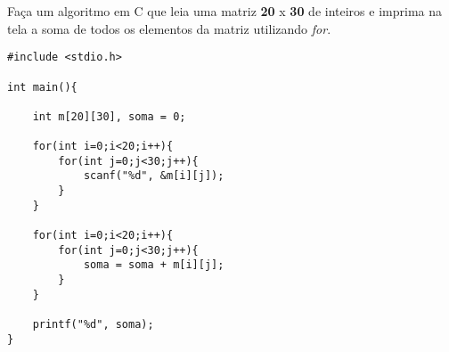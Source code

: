 
\question[10]

Faça um algoritmo em C que leia uma matriz \textbf{20} x \textbf{30} de inteiros e imprima na tela a soma de todos os elementos da matriz utilizando \emph{for}.

\begin{solution}
\begin{lstlisting}
#include <stdio.h>

int main(){
	
	int m[20][30], soma = 0;
	
	for(int i=0;i<20;i++){
		for(int j=0;j<30;j++){
			scanf("%d", &m[i][j]);
		}
	}
	
	for(int i=0;i<20;i++){
		for(int j=0;j<30;j++){
			soma = soma + m[i][j];
		}
	}
	
	printf("%d", soma);
} 
\end{lstlisting}
\end{solution}
